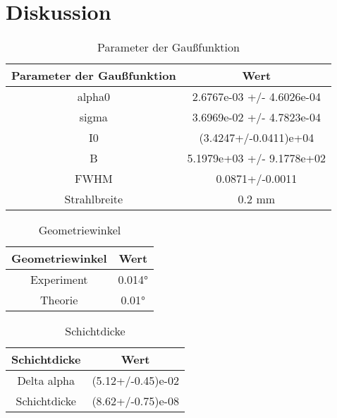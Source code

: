 \section{Diskussion}
\label{sec:Diskussion}


\begin{table}[h!]
    \centering
    \begin{tabular}{c c}
        \toprule
        \textbf{Parameter der Gaußfunktion} & \textbf{Wert} \\ 
        \midrule
        alpha0 & 2.6767e-03 +/- 4.6026e-04 \\ 
        sigma & 3.6969e-02 +/- 4.7823e-04 \\ 
        I0 & (3.4247+/-0.0411)e+04 \\ 
        B & 5.1979e+03 +/- 9.1778e+02 \\ 
        FWHM & 0.0871+/-0.0011 \\ 
        Strahlbreite & 0.2 mm \\ 
        \bottomrule
    \end{tabular}
    \caption{Parameter der Gaußfunktion}
    \label{tab:gauss}
\end{table}

\begin{table}[h!]
    \centering
    \begin{tabular}{c c}
        \toprule
        \textbf{Geometriewinkel} & \textbf{Wert} \\ 
        \midrule
        Experiment & 0.014° \\ 
        Theorie & 0.01° \\ 
        \bottomrule
    \end{tabular}
    \caption{Geometriewinkel}
    \label{tab:geometriewinkel}
\end{table}

\begin{table}[h!]
    \centering
    \begin{tabular}{c c}
        \toprule
        \textbf{Schichtdicke} & \textbf{Wert} \\ 
        \midrule
        Delta alpha & (5.12+/-0.45)e-02 \\ 
        Schichtdicke & (8.62+/-0.75)e-08 \\ 
        \bottomrule
    \end{tabular}
    \caption{Schichtdicke}
    \label{tab:schichtdicke}
\end{table}

